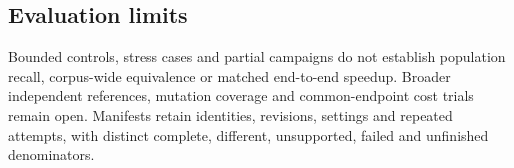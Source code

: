 \subsection{Evaluation limits}
Bounded controls, stress cases and partial campaigns do not establish population
recall, corpus-wide equivalence or matched end-to-end speedup. Broader independent
references, mutation coverage and common-endpoint cost trials remain open.
Manifests retain identities, revisions, settings and repeated attempts, with
distinct complete, different, unsupported, failed and unfinished denominators.
